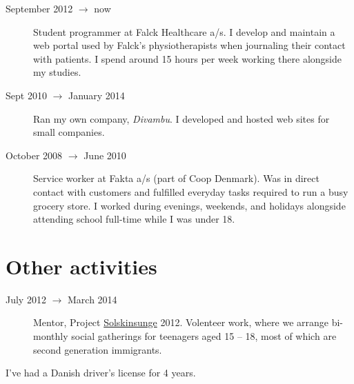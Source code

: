 \documentclass[margin,line,a4paper]{resume}
\begin{document}
\begin{resume}
\begin{description}
  \item[September 2012 $\rightarrow$ now] Student programmer at Falck
  Healthcare a/s. I develop and maintain a web portal used by
  Falck's physiotherapists when journaling their contact with patients.
  I spend around 15 hours per week working there alongside my studies.

  \item[Sept 2010 $\rightarrow$ January 2014] Ran my own company,
    \emph{Divambu}. I developed and hosted web sites for small companies.

  \item[October 2008 $\rightarrow$ June 2010] Service worker at
    Fakta a/s (part of Coop Denmark). Was in direct contact with customers
    and fulfilled everyday tasks required to run a busy grocery store. I
    worked during evenings, weekends, and holidays alongside attending
    school full-time while I was under 18.
\end{description}

\section{\mysidestyle Other activities}\vspace{1mm}
\begin{description}
  \item[July 2012 $\rightarrow$ March 2014] Mentor, Project
    \href{http://www.urk.dk/solskinsunge/}{Solskinsunge} 2012. Volenteer
    work, where we arrange bi-monthly social gatherings for teenagers aged
    15 -- 18, most of which are second generation immigrants.
\end{description}


I've had a Danish driver's license for 4 years.


\end{resume}
\end{document}
